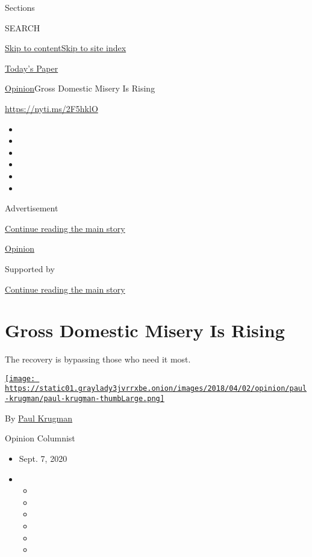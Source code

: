 Sections

SEARCH

\protect\hyperlink{site-content}{Skip to
content}\protect\hyperlink{site-index}{Skip to site index}

\href{https://myaccount.nytimes3xbfgragh.onion/auth/login?response_type=cookie\&client_id=vi}{}

\href{https://www.nytimes3xbfgragh.onion/section/todayspaper}{Today's
Paper}

\href{/section/opinion}{Opinion}\textbar{}Gross Domestic Misery Is
Rising

\url{https://nyti.ms/2F5hklO}

\begin{itemize}
\item
\item
\item
\item
\item
\item
\end{itemize}

Advertisement

\protect\hyperlink{after-top}{Continue reading the main story}

\href{/section/opinion}{Opinion}

Supported by

\protect\hyperlink{after-sponsor}{Continue reading the main story}

\hypertarget{gross-domestic-misery-is-rising}{%
\section{Gross Domestic Misery Is
Rising}\label{gross-domestic-misery-is-rising}}

The recovery is bypassing those who need it most.

\href{https://www.nytimes3xbfgragh.onion/by/paul-krugman}{\texttt{[image: https://static01.graylady3jvrrxbe.onion/images/2018/04/02/opinion/paul-krugman/paul-krugman-thumbLarge.png]}}

By \href{https://www.nytimes3xbfgragh.onion/by/paul-krugman}{Paul
Krugman}

Opinion Columnist

\begin{itemize}
\item
  Sept. 7, 2020
\item
  \begin{itemize}
  \item
  \item
  \item
  \item
  \item
  \item
  \end{itemize}
\end{itemize}

